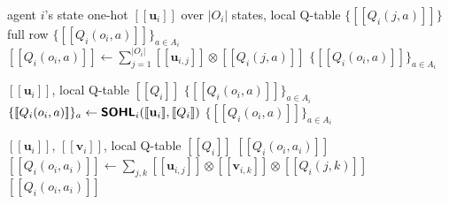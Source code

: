 \documentclass[letterpaper,10pt]{article}
\newcommand{\textbt}[1]{\textsf{\textbf{#1}}}
\theoremstyle{remark}
\newcommand{\En}[1]{[\![#1]\!]}
\begin{document}
\begin{algorithm}[t]
\caption{\textbt{SOHL}: Secure One-Hot Lookup (row-fetch)}
\label{alg:onehot}
\small
\begin{algorithmic}[1]
\Require agent $i$'s state one-hot $\En{\mathbf{u}_i}$ over $|O_i|$ states,
local Q-table $\{\En{Q_i(j,a)}\}$
\Ensure full row $\{\En{Q_i(o_i,a)}\}_{a\in A_i}$
  \State $\En{Q_i(o_i,a)} \gets
    \textstyle\sum_{j=1}^{|O_i|} \En{\mathbf{u}_{i,j}} \otimes \En{Q_i(j,a)}$
\EndFor
\State \Return $\{\En{Q_i(o_i,a)}\}_{a\in A_i}$
\end{algorithmic}
\end{algorithm}

\begin{algorithm}[t]
\caption{\textbt{SAQSA}: Secure Action and Q-value Selector}
\label{alg:saqsa}
\small
\begin{algorithmic}[1]
\Require $\En{\mathbf{u}_i}$, local Q-table $\En{Q_i}$
\Ensure $\{\En{Q_i(o_i,a)}\}_{a\in A_i}$
\State $\{\En{Q_i(o_i,a)}\}_a \gets \textbt{SOHL}_i(\En{\mathbf{u}_i},\En{Q_i})$
\State \Return $\{\En{Q_i(o_i,a)}\}_{a\in A_i}$
\end{algorithmic}
\end{algorithm}

\begin{algorithm}[t]
\caption{\textbt{SQSA}: Secure Q-value Selector}
\label{alg:sqsa}
\small
\begin{algorithmic}[1]
\Require $\En{\mathbf{u}_i}$, $\En{\mathbf{v}_i}$, local Q-table $\En{Q_i}$
\Ensure $\En{Q_i(o_i,a_i)}$
\State $\En{Q_i(o_i,a_i)} \gets
  \textstyle\sum_{j,k}\En{\mathbf{u}_{i,j}}\otimes\En{\mathbf{v}_{i,k}}
  \otimes \En{Q_i(j,k)}$
\State \Return $\En{Q_i(o_i,a_i)}$
\end{algorithmic}
\end{algorithm}
\end{document}
